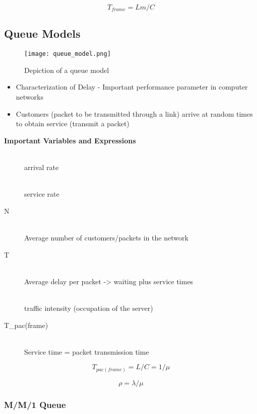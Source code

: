 \documentclass[../resumosRCOM.tex]{subfiles}
\begin{document}
\begin{equation}
    T_{frame} = Lm/C
\end{equation}

\subsection{Queue Models}

\begin{figure}[H]
    \centering
    \texttt{[image: queue\_model.png]}
    \caption{Depiction of a queue model}
\end{figure}

\begin{itemize}
    \item Characterization of Delay - Important performance parameter in computer networks
    \item Customers (packet to be transmitted through a link) arrive at random times to obtain service (transmit a packet) 
\end{itemize}

\begin{description}
    \item [\textbf{Important Variables and Expressions}]
    \item[\lambda] \hfill \\ arrival rate
    \item[\mu] \hfill \\ service rate
    \item[N] \hfill \\ Average number of customers/packets in the network
    \item[T] \hfill \\ Average delay per packet -> waiting plus service times 
    \item[\rho] \hfill \\ traffic intensity (occupation of the server)
    \item[T_{pac(frame)}] \hfill \\ Service time = packet transmission time
\end{description}

\begin{equation}
    T_{pac(frame)} = L/C = 1/\mu
\end{equation}

\begin{equation}
    \rho = \lambda/\mu
\end{equation}

\subsubsection{M/M/1 Queue}
\end{document}
